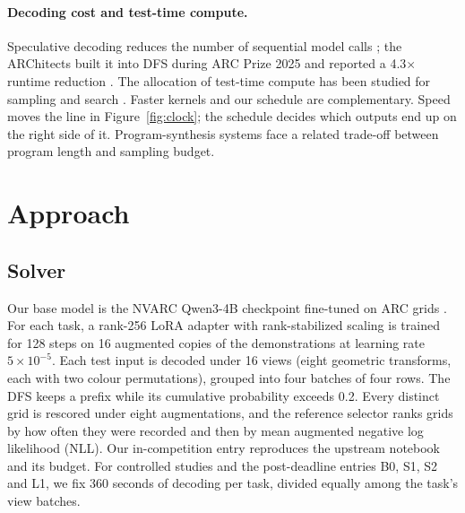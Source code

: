 \documentclass[10pt,twocolumn]{article}
\theoremstyle{plain}\newtheorem{proposition}{Proposition}
\theoremstyle{definition}\newtheorem{corollary}{Corollary}
\begin{document}
\paragraph{Decoding cost and test-time compute.} Speculative decoding reduces the number of sequential model calls \citep{leviathan2023}; the ARChitects built it into DFS during ARC Prize 2025 and reported a 4.3$\times$ runtime reduction \citep{franzen2025,architects2025}. The allocation of test-time compute has been studied for sampling and search \citep{snell2024}. Faster kernels and our schedule are complementary. Speed moves the line in Figure~\ref{fig:clock}; the schedule decides which outputs end up on the right side of it. Program-synthesis systems \citep{pourcel2025} face a related trade-off between program length and sampling budget.

\section{Approach}\label{sec:method}
\subsection{Solver}
Our base model is the NVARC Qwen3-4B checkpoint fine-tuned on ARC grids \citep{sorokin2025}. For each task, a rank-256 LoRA adapter \citep{hu2022} with rank-stabilized scaling \citep{kalajdzievski2023} is trained for 128 steps on 16 augmented copies of the demonstrations at learning rate $5\times10^{-5}$. Each test input is decoded under 16 views (eight geometric transforms, each with two colour permutations), grouped into four batches of four rows. The DFS keeps a prefix while its cumulative probability exceeds 0.2. Every distinct grid is rescored under eight augmentations, and the reference selector ranks grids by how often they were recorded and then by mean augmented negative log likelihood (NLL). Our in-competition entry reproduces the upstream notebook and its budget. For controlled studies and the post-deadline entries B0, S1, S2 and L1, we fix 360 seconds of decoding per task, divided equally among the task's view batches.
\end{document}
